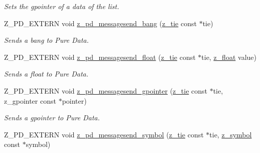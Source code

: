 \begin{DoxyCompactItemize}
\begin{DoxyCompactList}\small\item\em Sets the gpointer of a data of the list. \end{DoxyCompactList}\item 
\hypertarget{group__zpd_ga4031d84c8950c341aba2245c84b32c57}{Z\-\_\-\-P\-D\-\_\-\-E\-X\-T\-E\-R\-N void \hyperlink{group__zpd_ga4031d84c8950c341aba2245c84b32c57}{z\-\_\-pd\-\_\-messagesend\-\_\-bang} (\hyperlink{group__zpd_ga36a59f7502bf6b62bab3e65cc08fe08d}{z\-\_\-tie} const $\ast$tie)}\label{group__zpd_ga4031d84c8950c341aba2245c84b32c57}

\begin{DoxyCompactList}\small\item\em Sends a bang to Pure Data. \end{DoxyCompactList}\item 
\hypertarget{group__zpd_ga977d4390a98e6aaa1829755ace269e69}{Z\-\_\-\-P\-D\-\_\-\-E\-X\-T\-E\-R\-N void \hyperlink{group__zpd_ga977d4390a98e6aaa1829755ace269e69}{z\-\_\-pd\-\_\-messagesend\-\_\-float} (\hyperlink{group__zpd_ga36a59f7502bf6b62bab3e65cc08fe08d}{z\-\_\-tie} const $\ast$tie, \hyperlink{group__zpd_ga86e16508ee69192343f6f6ad26fcef55}{z\-\_\-float} value)}\label{group__zpd_ga977d4390a98e6aaa1829755ace269e69}

\begin{DoxyCompactList}\small\item\em Sends a float to Pure Data. \end{DoxyCompactList}\item 
\hypertarget{group__zpd_ga50d5e0d4db3e5de7e0eac3ebf7d8d9a0}{Z\-\_\-\-P\-D\-\_\-\-E\-X\-T\-E\-R\-N void \hyperlink{group__zpd_ga50d5e0d4db3e5de7e0eac3ebf7d8d9a0}{z\-\_\-pd\-\_\-messagesend\-\_\-gpointer} (\hyperlink{group__zpd_ga36a59f7502bf6b62bab3e65cc08fe08d}{z\-\_\-tie} const $\ast$tie, z\-\_\-gpointer const $\ast$pointer)}\label{group__zpd_ga50d5e0d4db3e5de7e0eac3ebf7d8d9a0}

\begin{DoxyCompactList}\small\item\em Sends a gpointer to Pure Data. \end{DoxyCompactList}\item 
\hypertarget{group__zpd_gaeca7ca85bf95e6b7621499ecafec81a9}{Z\-\_\-\-P\-D\-\_\-\-E\-X\-T\-E\-R\-N void \hyperlink{group__zpd_gaeca7ca85bf95e6b7621499ecafec81a9}{z\-\_\-pd\-\_\-messagesend\-\_\-symbol} (\hyperlink{group__zpd_ga36a59f7502bf6b62bab3e65cc08fe08d}{z\-\_\-tie} const $\ast$tie, \hyperlink{group__zpd_ga43e609e9bccc7a2018b8f16558b9494c}{z\-\_\-symbol} const $\ast$symbol)}\label{group__zpd_gaeca7ca85bf95e6b7621499ecafec81a9}


\end{DoxyCompactItemize}
